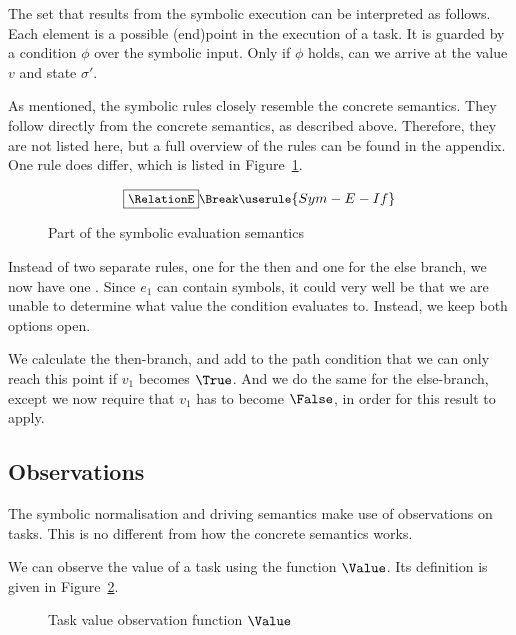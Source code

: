 The set that results from the symbolic execution can be interpreted as follows.
Each element is a possible (end)point in the execution of a task.
It is guarded by a condition $\phi$ over the symbolic input.
Only if $\phi$ holds, can we arrive at the value $v$ and state $\sigma'$.

As mentioned, the symbolic rules closely resemble the concrete semantics.
They follow directly from the concrete semantics, as described above.
Therefore, they are not listed here, but a full overview of the rules can be found in the appendix.
One rule does differ, which is listed in Figure~\ref{fig:eval}.

\begin{figure}[h]
\begin{gather*}
  \small
  \boxed{\RelationE} \Break
  \userule{Sym-E-If}
\end{gather*}
\caption{Part of the symbolic evaluation semantics}
\label{fig:eval}
\end{figure}

Instead of two separate rules, one for the then and one for the else branch, we now have one .
Since $e_1$ can contain symbols, it could very well be that we are unable to determine what value the condition evaluates to.
Instead, we keep both options open.

We calculate the then-branch, and add to the path condition that we can only reach this point if $v_1$ becomes $\True$.
And we do the same for the else-branch, except we now require that $v_1$ has to become $\False$, in order for this result to apply.

\subsection{Observations}
\label{subsec:observations}
The symbolic normalisation and driving semantics make use of observations on tasks.
This is no different from how the concrete \TOPHAT semantics works.

We can observe the value of a task using the function $\Value$.
Its definition is given in Figure~\ref{fig:value}.

\begin{figure}
  \begin{center}
    \small
  \end{center}
  \caption{Task value observation function $\Value$}
  \label{fig:value}
\end{figure}

